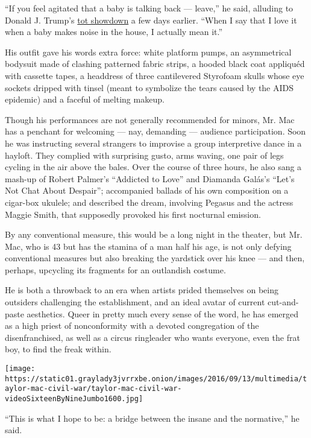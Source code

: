 ``If you feel agitated that a baby is talking back --- leave,'' he said,
alluding to Donald J. Trump's
\href{http://www.nytimes3xbfgragh.onion/2016/08/03/us/politics/donald-trump-baby.html}{tot
showdown} a few days earlier. ``When I say that I love it when a baby
makes noise in the house, I actually mean it.''

His outfit gave his words extra force: white platform pumps, an
asymmetrical bodysuit made of clashing patterned fabric strips, a hooded
black coat appliquéd with cassette tapes, a headdress of three
cantilevered Styrofoam skulls whose eye sockets dripped with tinsel
(meant to symbolize the tears caused by the AIDS epidemic) and a faceful
of melting makeup.

Though his performances are not generally recommended for minors, Mr.
Mac has a penchant for welcoming --- nay, demanding --- audience
participation. Soon he was instructing several strangers to improvise a
group interpretive dance in a hayloft. They complied with surprising
gusto, arms waving, one pair of legs cycling in the air above the bales.
Over the course of three hours, he also sang a mash-up of Robert
Palmer's ``Addicted to Love'' and Diamanda Galás's ``Let's Not Chat
About Despair''; accompanied ballads of his own composition on a
cigar-box ukulele; and described the dream, involving Pegasus and the
actress Maggie Smith, that supposedly provoked his first nocturnal
emission.

By any conventional measure, this would be a long night in the theater,
but Mr. Mac, who is 43 but has the stamina of a man half his age, is not
only defying conventional measures but also breaking the yardstick over
his knee --- and then, perhaps, upcycling its fragments for an
outlandish costume.

He is both a throwback to an era when artists prided themselves on being
outsiders challenging the establishment, and an ideal avatar of current
cut-and-paste aesthetics. Queer in pretty much every sense of the word,
he has emerged as a high priest of nonconformity with a devoted
congregation of the disenfranchised, as well as a circus ringleader who
wants everyone, even the frat boy, to find the freak within.

\texttt{[image: https://static01.graylady3jvrrxbe.onion/images/2016/09/13/multimedia/taylor-mac-civil-war/taylor-mac-civil-war-videoSixteenByNineJumbo1600.jpg]}

``This is what I hope to be: a bridge between the insane and the
normative,'' he said.


